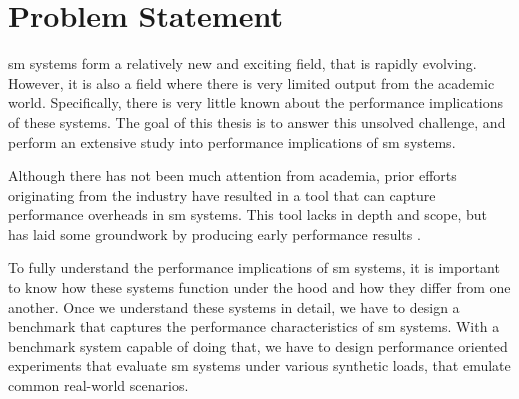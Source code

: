 \section{Problem Statement}
\label{sec:introduction:problem-statement}



\Gls{sm} systems form a relatively new and exciting field, that is rapidly evolving. However, it is also a field where there is very limited output from the academic world. Specifically, there is very little known about the performance implications of these systems. The goal of this thesis is to answer this unsolved challenge, and perform an extensive study into performance implications of \gls{sm} systems. 

Although there has not been much attention from academia, prior efforts originating from the industry have resulted in a tool \cite{kinvolk-bench} that can capture performance overheads in \gls{sm} systems. This tool lacks in depth and scope, but has laid some groundwork by producing early performance results \cite{bench-istio-linkerd-2019, bench-istio-linkerd-2021}. 


To fully understand the performance implications of \gls{sm} systems, it is important to know how these systems function under the hood and how they differ from one another. Once we understand these systems in detail, we have to design a benchmark that captures the performance characteristics of \gls{sm} systems. With a benchmark system capable of doing that, we have to design performance oriented experiments that evaluate \gls{sm} systems under various synthetic loads, that emulate common real-world scenarios.



